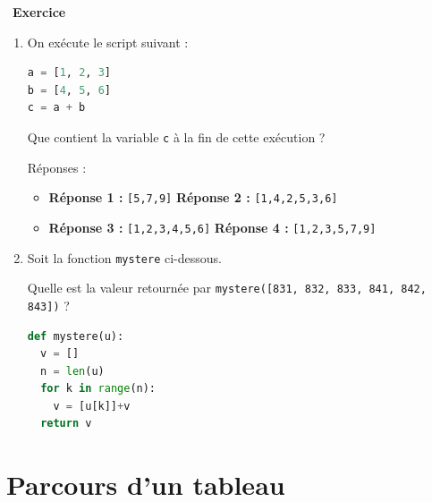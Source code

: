 \documentclass[
  11pt,
]{article}
\newcommand{\passthrough}[1]{#1}
\newcounter{exo}
\newenvironment{exercice}[1]
{\par \medskip   \addtocounter{exo}{1} \noindent  
\begin{bclogo}[arrondi =0.1,   noborder = true, logo=\bccrayon, marge=4]{~\textbf{Exercice} \textbf{\theexo} {\itshape #1} }  \par}
{
\end{bclogo}
 \par \bigskip }
\newcounter{def}
\newcounter{cours}
\begin{document}
\begin{exercice}{}

\begin{enumerate}
\def\labelenumi{\arabic{enumi}.}
\item
  On exécute le script suivant :

\begin{lstlisting}[language=Python]
a = [1, 2, 3]
b = [4, 5, 6]
c = a + b
\end{lstlisting}

  Que contient la variable \passthrough{\lstinline!c!} à la fin de cette
  exécution ?

  Réponses :

  \begin{itemize}
  \item
    \textbf{Réponse 1 :} \passthrough{\lstinline![5,7,9]!}
    \textbf{Réponse 2 :} \passthrough{\lstinline![1,4,2,5,3,6]!}
  \item
    \textbf{Réponse 3 :} \passthrough{\lstinline![1,2,3,4,5,6]!}
    \textbf{Réponse 4 :} \passthrough{\lstinline![1,2,3,5,7,9]!}
  \end{itemize}
\item
  Soit la fonction \passthrough{\lstinline!mystere!} ci-dessous.

  Quelle est la valeur retournée par
  \passthrough{\lstinline!mystere([831, 832, 833, 841, 842, 843])!} ?

\begin{lstlisting}[language=Python]
def mystere(u):
  v = []
  n = len(u)
  for k in range(n):
    v = [u[k]]+v
  return v
\end{lstlisting}
\end{enumerate}

\end{exercice}

\hypertarget{parcours-dun-tableau}{%
\section{Parcours d'un tableau}\label{parcours-dun-tableau}}
\end{document}
